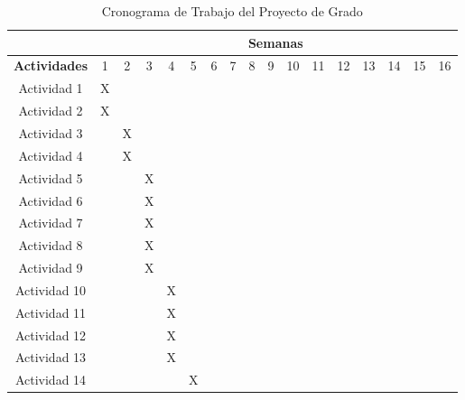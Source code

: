 \begin{center}
\begin{longtable}[c]{|c|c|c|c|c|c|c|c|c|c|c|c|c|c|c|c|c|}
    \caption{Cronograma de Trabajo del Proyecto de Grado}
    \label{tab:cronogramatrabajo}
    \\ \hline
    ~                      & \multicolumn{16}{c|}{\textbf{Semanas}} \\ \hline
    \textbf{Actividades}   & 1 & 2 & 3 & 4 & 5 & 6 & 7 & 8 & 9 & 10 & 11 & 12 & 13 & 14 & 15 & 16 \\ \hline
    Actividad 1            & X & ~ & ~ & ~ & ~ & ~ & ~ & ~ & ~ & ~  & ~  & ~  & ~  & ~  & ~  & ~  \\ \hline
    Actividad 2            & X & ~ & ~ & ~ & ~ & ~ & ~ & ~ & ~ & ~  & ~  & ~  & ~  & ~  & ~  & ~  \\ \hline
    Actividad 3            & ~ & X & ~ & ~ & ~ & ~ & ~ & ~ & ~ & ~  & ~  & ~  & ~  & ~  & ~  & ~  \\ \hline
    Actividad 4            & ~ & X & ~ & ~ & ~ & ~ & ~ & ~ & ~ & ~  & ~  & ~  & ~  & ~  & ~  & ~  \\ \hline
    Actividad 5            & ~ & ~ & X & ~ & ~ & ~ & ~ & ~ & ~ & ~  & ~  & ~  & ~  & ~  & ~  & ~  \\ \hline
    Actividad 6            & ~ & ~ & X & ~ & ~ & ~ & ~ & ~ & ~ & ~  & ~  & ~  & ~  & ~  & ~  & ~  \\ \hline
    Actividad 7            & ~ & ~ & X & ~ & ~ & ~ & ~ & ~ & ~ & ~  & ~  & ~  & ~  & ~  & ~  & ~  \\ \hline
    Actividad 8            & ~ & ~ & X & ~ & ~ & ~ & ~ & ~ & ~ & ~  & ~  & ~  & ~  & ~  & ~  & ~  \\ \hline
    Actividad 9            & ~ & ~ & X & ~ & ~ & ~ & ~ & ~ & ~ & ~  & ~  & ~  & ~  & ~  & ~  & ~  \\ \hline
    Actividad 10            & ~ & ~ & ~ & X & ~ & ~ & ~ & ~ & ~ & ~  & ~  & ~  & ~  & ~  & ~  & ~  \\ \hline
    Actividad 11            & ~ & ~ & ~ & X & ~ & ~ & ~ & ~ & ~ & ~  & ~  & ~  & ~  & ~  & ~  & ~  \\ \hline
    Actividad 12            & ~ & ~ & ~ & X & ~ & ~ & ~ & ~ & ~ & ~  & ~  & ~  & ~  & ~  & ~  & ~  \\ \hline
    Actividad 13            & ~ & ~ & ~ & X & ~ & ~ & ~ & ~ & ~ & ~  & ~  & ~  & ~  & ~  & ~  & ~  \\ \hline
    Actividad 14            & ~ & ~ & ~ & ~ & X & ~ & ~ & ~ & ~ & ~  & ~  & ~  & ~  & ~  & ~  & ~  \\ \hline

\end{longtable}
\end{center}
